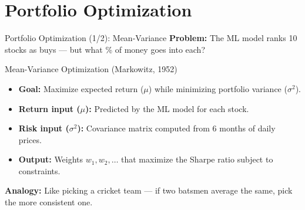 \documentclass[aspectratio=169, 10pt]{beamer}
\begin{document}
\section{Portfolio Optimization}
\begin{frame}{Portfolio Optimization (1/2): Mean-Variance}
    \textbf{Problem:} The ML model ranks 10 stocks as buys — but what \% of money goes into each?
    \vspace{0.3em}
    \begin{block}{Mean-Variance Optimization (Markowitz, 1952)}
        \begin{itemize}
            \item \textbf{Goal:} Maximize expected return ($\mu$) while minimizing portfolio variance ($\sigma^2$).
            \item \textbf{Return input ($\mu$):} Predicted by the ML model for each stock.
            \item \textbf{Risk input ($\sigma^2$):} Covariance matrix computed from 6 months of daily prices.
            \item \textbf{Output:} Weights $w_1, w_2, \ldots$ that maximize the Sharpe ratio subject to constraints.
        \end{itemize}
    \end{block}
    \vspace{0.3em}
    \small \textbf{Analogy:} Like picking a cricket team — if two batsmen average the same, pick the more consistent one.
\end{frame}
\end{document}
